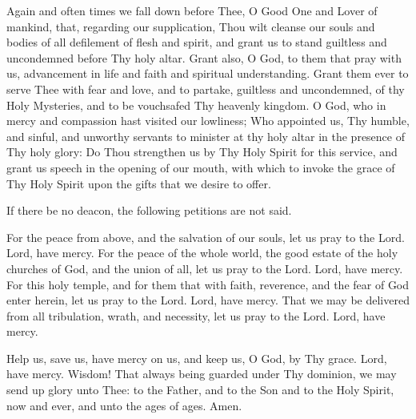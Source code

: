 \begin{semisecret}
    \begin{secretprayerbasil}
        Again and often times we fall down before Thee, O Good One and Lover of mankind, that, regarding our supplication, Thou wilt cleanse our souls and bodies of all defilement of flesh and spirit, and grant us to stand guiltless and uncondemned before Thy holy altar. Grant also, O God, to them that pray with us, advancement in life and faith and spiritual understanding. Grant them ever to serve Thee with fear and love, and to partake, guiltless and uncondemned, of thy Holy Mysteries, and to be vouchsafed Thy heavenly kingdom.
        \switchcolumn
        O God, who in mercy and compassion hast visited our lowliness; Who appointed us, Thy humble, and sinful, and unworthy servants to minister at thy holy altar in the presence of Thy holy glory: Do Thou strengthen us by Thy Holy Spirit for this service, and grant us speech in the opening of our mouth, with which to invoke the grace of Thy Holy Spirit upon the gifts that we desire to offer.
    \end{secretprayerbasil}
\end{semisecret}

\begin{rubricsection}
    \begin{rubricmed}
        If there be no deacon, the following petitions are not said.
    \end{rubricmed}
    \begin{liturgicaltext}
        \deacon For the peace from above, and the salvation of our souls, let us pray to the Lord.
        \choir Lord, have mercy.
        \deacon For the peace of the whole world, the good estate of the holy churches of God, and the union of all, let us pray to the Lord.
        \choir Lord, have mercy.
        \deacon For this holy temple, and for them that with faith, reverence, and the fear of God enter herein, let us pray to the Lord.
        \choir Lord, have mercy.
        \deacon That we may be delivered from all tribulation, wrath, and necessity, let us pray to the Lord.
        \choir Lord, have mercy.
    \end{liturgicaltext}
\end{rubricsection}

\begin{liturgicaltext}
    \deacon Help us, save us, have mercy on us, and keep us, O God, by Thy grace.
    \choir Lord, have mercy.
    \deacon Wisdom!
    \priest That always being guarded under Thy dominion, we may send up glory unto Thee: to the Father, and to the Son and to the Holy Spirit, now and ever, and unto the ages of ages.
    \choir Amen.
\end{liturgicaltext}
